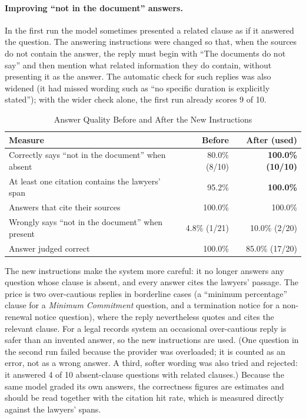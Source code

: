 \paragraph*{Improving ``not in the document'' answers.} In the first run the model sometimes presented a related
clause as if it answered the question. The answering instructions were changed so that, when the sources do
not contain the answer, the reply must begin with ``The documents do not say'' and then mention what related
information they do contain, without presenting it as the answer. The automatic check for such replies was
also widened (it had missed wording such as ``no specific duration is explicitly stated''); with the wider
check alone, the first run already scores 9 of 10.

\begin{table}[H]\centering
\caption{Answer Quality Before and After the New Instructions}\label{tab:ev-answers}
\begin{tabular}{|l|r|r|}\hline
\textbf{Measure} & \textbf{Before} & \textbf{After (used)} \\ \hline
Correctly says ``not in the document'' when absent & 80.0\% (8/10) & \textbf{100.0\% (10/10)} \\ \hline
At least one citation contains the lawyers' span & 95.2\% & \textbf{100.0\%} \\ \hline
Answers that cite their sources & 100.0\% & 100.0\% \\ \hline
Wrongly says ``not in the document'' when present & 4.8\% (1/21) & 10.0\% (2/20) \\ \hline
Answer judged correct & 100.0\% & 85.0\% (17/20) \\ \hline
\end{tabular}
\end{table}
The new instructions make the system more careful: it no longer answers any question whose clause is absent,
and every answer cites the lawyers' passage. The price is two over-cautious replies in borderline cases (a
``minimum percentage'' clause for a \emph{Minimum Commitment} question, and a termination notice for a
non-renewal notice question), where the reply nevertheless quotes and cites the relevant clause. For a legal
records system an occasional over-cautious reply is safer than an invented answer, so the new instructions
are used. (One question in the second run failed because the provider was overloaded; it is counted as an
error, not as a wrong answer. A third, softer wording was also tried and rejected: it answered 4 of 10
absent-clause questions with related clauses.) Because the same model graded its own answers, the
correctness figures are estimates and should be read together with the citation hit rate, which is measured
directly against the lawyers' spans.

